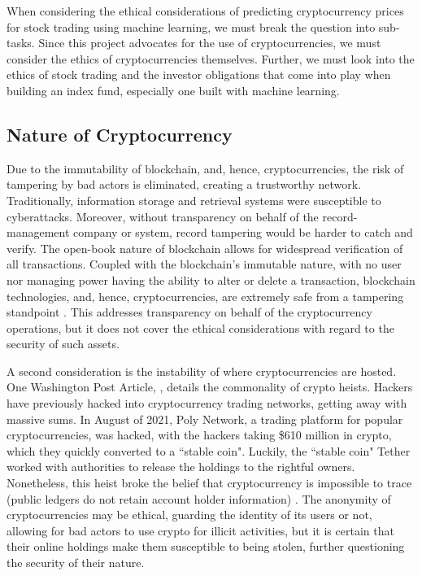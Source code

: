 \documentclass[10pt,twocolumn]{article}
\begin{document}
When considering the ethical considerations of predicting cryptocurrency prices for stock trading using machine learning, we must break the question into sub-tasks. Since this project advocates for the use of cryptocurrencies, we must consider the ethics of cryptocurrencies themselves. Further, we must look into the ethics of stock trading and the investor obligations that come into play when building an index fund, especially one built with machine learning.

\subsection{Nature of Cryptocurrency}

Due to the immutability of blockchain, and, hence, cryptocurrencies, the risk of tampering by bad actors is eliminated, creating a trustworthy network. Traditionally, information storage and retrieval systems were susceptible to cyberattacks. Moreover, without transparency on behalf of the record-management company or system, record tampering would be harder to catch and verify. The open-book nature of blockchain allows for widespread verification of all transactions. Coupled with the blockchain's immutable nature, with no user nor managing power having the ability to alter or delete a transaction, blockchain technologies, and, hence, cryptocurrencies, are extremely safe from a tampering standpoint \cite{WhatIsBlockchain}. This addresses transparency on behalf of the cryptocurrency operations, but it does not cover the ethical considerations with regard to the security of such assets.

A second consideration is the instability of where cryptocurrencies are hosted. One Washington Post Article, , details the commonality of crypto heists. Hackers have previously hacked into cryptocurrency trading networks, getting away with massive sums. In August of 2021, Poly Network, a trading platform for popular cryptocurrencies, was hacked, with the hackers taking 
\$610 million in crypto, which they quickly converted to a ``stable coin". Luckily, the ``stable coin" Tether worked with authorities to release the holdings to the rightful owners. Nonetheless, this heist broke the belief that cryptocurrency is impossible to trace (public ledgers do not retain account holder information) \cite{TrackingStolenCrypto}. The anonymity of cryptocurrencies may be ethical, guarding the identity of its users or not, allowing for bad actors to use crypto for illicit activities, but it is certain that their online holdings make them susceptible to being stolen, further questioning the security of their nature.
\end{document}
